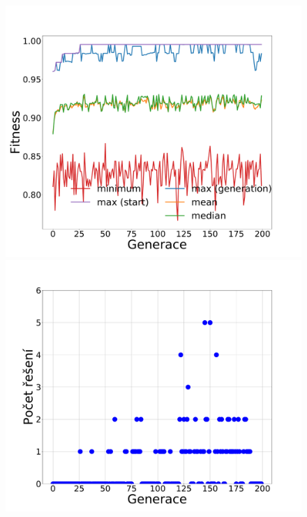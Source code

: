 \documentclass[11pt]{article}
\begin{document}
\begin{landscape}
\begin{figure}
\begin{minipage}[c]{0.35\textwidth}
        \centering\includegraphics[width=\textwidth]{img/m201g.pdf} 
    \end{minipage}
    \begin{minipage}[c]{0.35\textwidth}
        \centering \includegraphics[width=\textwidth]{img/m201s.pdf} 
    \end{minipage}
    \begin{minipage}[c]{0.35\textwidth}

\end{minipage}
\end{figure}
\end{landscape}
\end{document}
